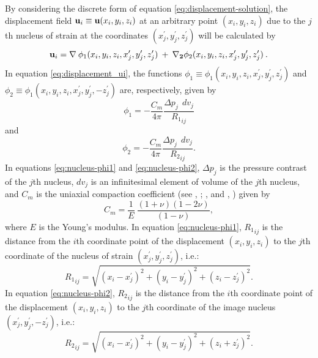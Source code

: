 \documentclass[journal abbreviation, manuscript]{copernicus}
\begin{document}
By considering the discrete form of equation \ref{eq:displacement-solution}, the displacement field  $ {\bf{u}}_{i} \equiv  {\bf{u}}(x_{i}, y_{i}, z_{i})$ at an arbitrary point $(x_{i}, y_{i}, z_{i})$ due to the $j$th nucleus of strain at the coordinates 
$(x^{\prime}_{j}, y^{\prime}_{j}, z^{\prime}_{j})$ will be calculated by
\begin{equation}
{\bf{u}}_{i}  = {\bf{\nabla}} \: 
{\phi_{1}(x_{i}, y_{i}, z_{i}, x^{\prime}_{j}, y^{\prime}_{j}, z^{\prime}_{j})} \: + \: {\bf{{\nabla}_{2}}} {\phi_{2}(x_{i}, y_{i}, z_{i}, x^{\prime}_{j}, y^{\prime}_{j}, z^{\prime}_{j})} \: . 
\label{eq:displacement_ui}
\end{equation}
In equation \ref{eq:displacement_ui}, the functions 
$\phi_{1} \equiv {\phi_{1}(x_{i}, y_{i}, z_{i}, x^{\prime}_{j}, y^{\prime}_{j}, z^{\prime}_{j})}$ and  
$\phi_{2} \equiv {\phi_{1}(x_{i}, y_{i}, z_{i}, x^{\prime}_{j}, y^{\prime}_{j}, -z^{\prime}_{j})}$
are, respectively, given by 
\begin{equation}
\phi_{1} = - \frac{C_m}{4 \pi}  \frac{\Delta p_{j} \: \:dv_j}{ {R_1}_{ij} }
\label{eq:nucleus-phi1}
\end{equation}
and
\begin{equation}
\phi_{2} = - \frac{C_m}{4 \pi}  \frac{\Delta p_{j} \: \:dv_j}{ {R_2}_{ij} }.
\label{eq:nucleus-phi2}
\end{equation}
In equations \ref{eq:nucleus-phi1} and \ref{eq:nucleus-phi2}, $\Delta p_j$  is the pressure contrast of the $j$th nucleus, $dv_j$ is an infinitesimal element of volume of the $j$th nucleus, and $C_m$ is the uniaxial compaction coefficient (see \citeauthor{Geertsma66}, \citeyear{Geertsma66}; \citeauthor{Tempone10}, \citeyear{Tempone10} and \citeauthor{Munoz&Roehl17}, \citeyear{Munoz&Roehl17}) given by
\begin{equation}
C_m = \frac{1}{E} \: \frac{(1 + \nu) (1  - 2\nu)}{(1-\nu)},
\label{eq:Cm}
\end{equation}
where $E$ is the Young’s modulus.
In equation \ref{eq:nucleus-phi1}, $ {R_1}_{ij}$ is the distance from the $i$th coordinate point of the displacement $ (x_{i}, y_{i}, z_{i})$ to the $j$th coordinate of the nucleus of strain $(x^{\prime}_{j}, y^{\prime}_{j}, z^{\prime}_{j})$, i.e.:
\begin{equation}
{R_1}_{ij} = {\sqrt{(x_{i}- x^{\prime}_{j})^{2} + (y_{i} - y^{\prime}_{j})^{2} + 
(z_{i} - z^{\prime}_{j})^{2}}}.
\label{eq:R1}
\end{equation}
In equation \ref{eq:nucleus-phi2}, $ {R_2}_{ij}$ is the distance from the $i$th coordinate point of the displacement $ (x_{i}, y_{i}, z_{i})$ to the $j$th coordinate of the image nucleus $(x^{\prime}_{j}, y^{\prime}_{j}, - z^{\prime}_{j})$, i.e.:
\begin{equation}
{R_2}_{ij} = {\sqrt{(x_{i}- x^{\prime}_{j})^{2} + (y_{i} - y^{\prime}_{j})^{2} + 
(z_{i} + z^{\prime}_{j})^{2}}}.
\label{eq:R2}
\end{equation}
\end{document}
